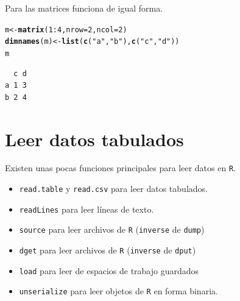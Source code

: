 \documentclass{article}\usepackage[]{graphicx}\usepackage[]{color}
\makeatletter
\newcommand{\hlnum}[1]{\textcolor[rgb]{0.686,0.059,0.569}{#1}}%
\newcommand{\hlstr}[1]{\textcolor[rgb]{0.192,0.494,0.8}{#1}}%
\newcommand{\hlopt}[1]{\textcolor[rgb]{0,0,0}{#1}}%
\newcommand{\hlstd}[1]{\textcolor[rgb]{0.345,0.345,0.345}{#1}}%
\newcommand{\hlkwb}[1]{\textcolor[rgb]{0.69,0.353,0.396}{#1}}%
\newcommand{\hlkwc}[1]{\textcolor[rgb]{0.333,0.667,0.333}{#1}}%
\newcommand{\hlkwd}[1]{\textcolor[rgb]{0.737,0.353,0.396}{\textbf{#1}}}%
\newenvironment{kframe}{%
 \def\at@end@of@kframe{}%
 \ifinner\ifhmode%
  \def\at@end@of@kframe{\end{minipage}}%
  \begin{minipage}{\columnwidth}%
 \fi\fi%
 \def\FrameCommand##1{\hskip\@totalleftmargin \hskip-\fboxsep
 \colorbox{shadecolor}{##1}\hskip-\fboxsep
     \hskip-\linewidth \hskip-\@totalleftmargin \hskip\columnwidth}%
 \MakeFramed {\advance\hsize-\width
   \@totalleftmargin\z@ \linewidth\hsize
   \@setminipage}}%
 {\par\unskip\endMakeFramed%
 \at@end@of@kframe}
\newenvironment{knitrout}{}{} %
\makeatother
\begin{document}
    Para las matrices funciona de igual forma.
\begin{knitrout}
\color{fgcolor}\begin{kframe}
\begin{alltt}
  \hlstd{m} \hlkwb{<-} \hlkwd{matrix}\hlstd{(}\hlnum{1}\hlopt{:}\hlnum{4}\hlstd{,} \hlkwc{nrow} \hlstd{=} \hlnum{2}\hlstd{,} \hlkwc{ncol} \hlstd{=} \hlnum{2}\hlstd{)}
  \hlkwd{dimnames}\hlstd{(m)} \hlkwb{<-} \hlkwd{list}\hlstd{(}\hlkwd{c}\hlstd{(}\hlstr{"a"}\hlstd{,} \hlstr{"b"}\hlstd{),} \hlkwd{c}\hlstd{(}\hlstr{"c"}\hlstd{,} \hlstr{"d"}\hlstd{))}
  \hlstd{m}
\end{alltt}
\begin{verbatim}
  c d
a 1 3
b 2 4
\end{verbatim}
\end{kframe}
\end{knitrout}
\section{Leer datos tabulados}
Existen unas pocas funciones principales para leer datos en \texttt{R}.
  \begin{itemize}
    \item \texttt{read.table} y \texttt{read.csv} para leer datos tabulados.
    \item \texttt{readLines} para leer líneas de texto.
    \item \texttt{source} para leer archivos de \texttt{R} (\texttt{inverse} de                \texttt{dump})
    \item \texttt{dget} para leer archivos de \texttt{R} (\texttt{inverse} de                  \texttt{dput})
    \item \texttt{load} para leer de espacios de trabajo guardados
    \item \texttt{unserialize} para leer objetos de \texttt{R} en forma binaria.
  \end{itemize}
\end{document}
